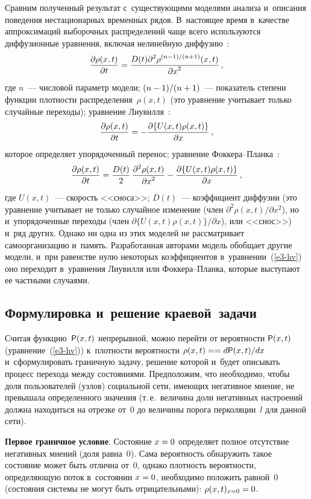 \begin{multicols}{2}
  Сравним полученный результат с~су\-щест\-ву\-ющи\-ми моделями анализа 
и~описания поведения нестационарных временн$\acute{\mbox{ы}}$х рядов. В~настоящее время 
в~качестве аппроксимаций выборочных распределений чаще всего 
используются диффузионные уравнения, включая нелинейную 
диффузию~\cite{18-hv}:
  $$
  \displaystyle\frac{\displaystyle \partial \rho(x,t)\mathstrut}{\displaystyle \partial t\mathstrut} =\displaystyle\frac{\displaystyle D(t)\partial^2\rho^{(n-1)/(n+1)}(x,t)\mathstrut}{\displaystyle \partial x^2\mathstrut}\,,
  $$
  где $n$~--- числовой параметр модели; $(n\hm-1)/(n\hm+1)$~--- показатель 
степени функции плотности распределения~$\rho(x,t)$ (это уравнение 
учитывает только случайные переходы); уравнение Лиувилля~\cite{18-hv}: 
  $$
  \displaystyle\frac{\displaystyle \partial \rho(x,t)\mathstrut}{\displaystyle \partial t\mathstrut}=-\displaystyle\frac{\displaystyle \partial \{ U(x,t)\rho(x,t)\}\mathstrut}{\displaystyle \partial x\mathstrut}\,,
  $$
  которое определяет упорядоченный перенос; уравнение  
Фок\-ке\-ра--План\-ка~\cite{19-hv}: 
  $$
  \displaystyle\frac{\displaystyle \partial\rho(x,t)\mathstrut}{\displaystyle \partial t\mathstrut}=\displaystyle\frac{\displaystyle D(t)\mathstrut}{\displaystyle 2\mathstrut}\,\displaystyle\frac{\displaystyle \partial^2\rho(x,t)\mathstrut}{\displaystyle \partial 
x^2\mathstrut} - \displaystyle\frac{\displaystyle \partial \{ U(x,t)\rho(x,t)\}\mathstrut}{\displaystyle \partial x\mathstrut}\,,
  $$
  где $U(x,t)$~--- скорость <<сноса>>; $D(t)$~--- коэффициент диффузии (это 
уравнение учитывает не только случайное изменение (член 
$\partial^2\rho(x,t)/\partial x^2$), но и~упорядоченные переходы (член $\partial 
\{ U(x,t)\rho(x,t)\}/\partial x$), или <<снос>>) и~ряд других. Однако ни одна из 
этих моделей не рассматривает самоорганизацию и~память. Разработанная 
авторами модель обобщает другие модели, и~при равенстве нулю некоторых 
коэффициентов в~уравнении~(\ref{e3-hv}) оно переходит в~уравнения 
Лиувилля или  
Фок\-ке\-ра--План\-ка, которые выступают ее частными случаями.
  
\subsection{Формулировка и~решение краевой~задачи}

  Считая функцию~${\sf P}(x,t)$ непрерывной, можно перейти от вероятности 
${\sf P}(x,t)$ (уравнение~(\ref{e3-hv})) к~плотности вероятности $\rho(x,t)\hm= 
=d{\sf P}(x,t)/dx$ и~сформулировать граничную задачу, решение которой и~будет 
описывать процесс перехода между состояниями. Предположим, что 
необходимо, чтобы доля пользователей (узлов) социальной сети, имеющих 
негативное мнение, не превышала определенного значения (т.\,е.\ величина 
доли негативных настроений должна находиться на отрезке от~0 до величины 
порога перколяции~$l$ для данной сети).
  
  \textbf{Первое граничное условие}. Состояние $x\hm=0$ определяет полное 
отсутствие негативных мнений (доля равна~0). Сама вероятность обнаружить 
такое состояние может быть отлична от~0, однако плотность вероятности, 
определяющую поток в~состоянии $x\hm=0$, необходимо положить равной~0 
(состояния системы не могут быть отрицательными): $\rho(x,t)_{x=0}\hm=0$.
  

\end{multicols}
